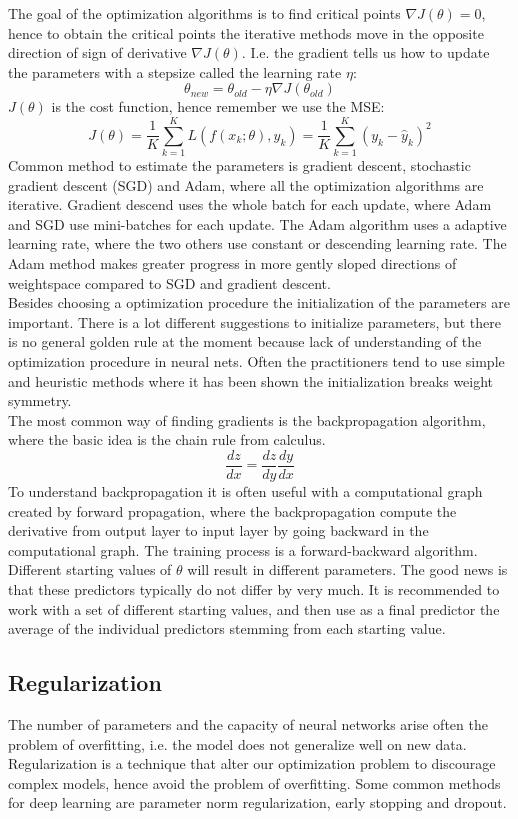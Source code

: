 The goal of the optimization algorithms is to find critical points $\nabla J(\theta)=0$, hence to obtain the critical points the iterative methods move in the opposite direction of sign of derivative $\nabla J(\theta)$. I.e. the gradient tells us how to update the parameters with a stepsize called the learning rate $\eta$:
$$\theta_{new}=\theta_{old} - \eta \nabla J(\theta_{old}) $$
$J(\theta)$ is the cost function, hence remember we use the MSE:
$$J(\theta)= \frac{1}{K}\sum_{k=1}^{K} L(f(x_k;\theta),y_k)=\frac{1}{K}\sum_{k=1}^{K} (y_k-\hat{y}_k)^2$$
Common method to estimate the parameters is gradient descent, stochastic gradient descent (SGD) and Adam, where all the optimization algorithms are iterative. Gradient descend uses the whole batch for each update, where Adam and SGD use mini-batches for each update. The Adam algorithm uses a adaptive learning rate, where the two others use constant or descending learning rate. The Adam method makes greater progress in more gently sloped directions of weightspace compared to SGD and gradient descent. \\

Besides choosing a optimization procedure the initialization of the parameters are important. There is a lot different suggestions to initialize parameters, but there is no general golden rule at the moment because lack of understanding of the optimization procedure in neural nets. Often the practitioners tend to use simple and heuristic methods where it has been shown the initialization breaks weight symmetry.\\

The most common way of finding gradients is the backpropagation algorithm, where the basic idea is the chain rule from calculus.
$$\frac{dz}{dx}= \frac{dz}{dy} \frac{dy}{dx}$$
To understand backpropagation it is often useful with a computational graph created by forward propagation, where the backpropagation compute the derivative from output layer to input layer by going backward in the computational graph. The training process is a forward-backward algorithm. Different starting values of $\theta$ will result in different parameters. The good news is that these predictors typically do not differ by very much. It is recommended to work with a set of different starting values, and then use as a final predictor the average of the individual predictors stemming from each starting value.

\subsection{Regularization}\label{regularization}
The number of parameters and the capacity of neural networks arise often the problem of overfitting, i.e. the model does not generalize well on new data. Regularization is a technique that alter our optimization problem to discourage complex models, hence avoid the problem of overfitting. Some common methods for deep learning are parameter norm regularization, early stopping and dropout.\\


